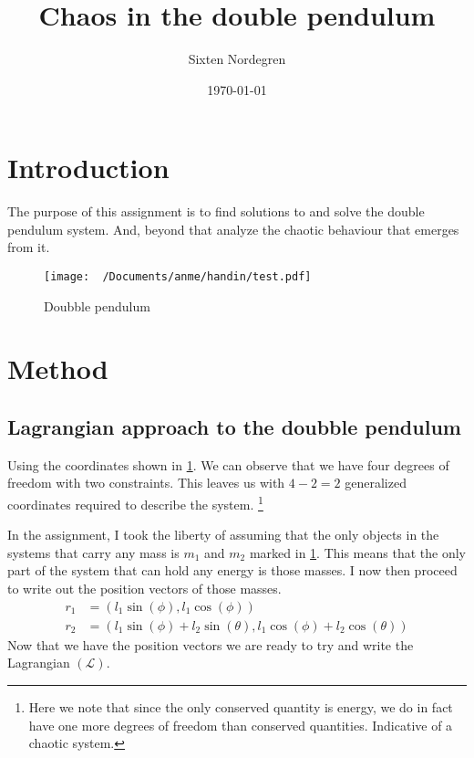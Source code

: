 \documentclass[twocolumn]{revtex4-2}
\newcommand{\Lagr}{\mathcal{L}}
\begin{document}
\date{\today}
\author{Sixten Nordegren}
\title{Chaos in the double pendulum}

\maketitle

\section{Introduction}
The purpose of this assignment is to find solutions to and solve the double pendulum system. And, beyond that analyze the chaotic behaviour that emerges from it. 
\begin{figure}[b]
	\texttt{[image: ~/Documents/anme/handin/test.pdf]}
	\caption{Doubble pendulum \label{fig: doubble pendulum}}
\end{figure}
\section{Method}
\subsection{Lagrangian approach to the doubble pendulum}
Using the coordinates shown in \ref{fig: doubble pendulum}. We can observe that we have four degrees of freedom with two constraints. This leaves us with $4 - 2  = 2$ generalized coordinates required to describe the system. \footnote{Here we note that since the only conserved quantity is energy, we do in fact have one more degrees of freedom than conserved quantities. Indicative of a chaotic system.}

In the assignment, I took the liberty of assuming that the only objects in the systems that carry any mass is $m_1$ and $m_2$ marked in \ref{fig: doubble pendulum}. This means that the only part of the system that can hold any energy is those masses. I now then proceed to write out the position vectors of those masses.
\begin{align*}
	r_1 &= (l_1 \sin{(\phi)}, l_1 \cos{(\phi)}) \\
	r_2 &= (l_1 \sin{(\phi)} + l_2 \sin{(\theta)}, l_1 \cos{(\phi)} + l_2\cos{(\theta)})
\end{align*}
Now that we have the position vectors we are ready to try and write the Lagrangian $(\Lagr)$.
\end{document}
